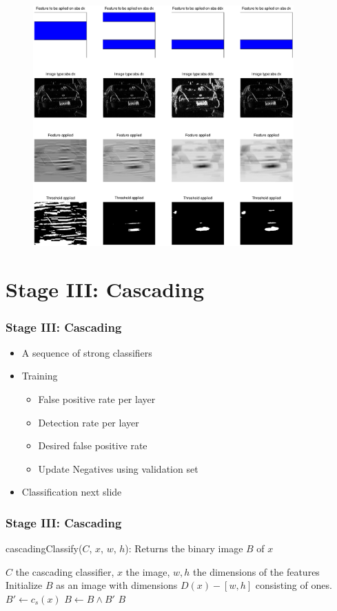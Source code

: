 \documentclass{beamer}
\begin{document}
\frame
{
	\begin{figure}[!ht]
	\centering
	\includegraphics[width=10cm]{../report/img/strongClassifier_layer2_img14}
	\label{fig:strongclassify}
	\end{figure}
}

\section{Stage III: Cascading}
\frame
{
  \frametitle{Stage III: Cascading}
	
  \begin{itemize}
  \item <+-| alert@+> A sequence of strong classifiers
  \item <+-| alert@+> Training
  \begin{itemize}
  	\item False positive rate per layer
  	\item Detection rate per layer
  	\item Desired false positive rate
  	\item Update Negatives using validation set
  \end{itemize}
  \item <+-| alert@+> Classification next slide
  \end{itemize}
}

\frame
{
  \frametitle{Stage III: Cascading}
  \begin{algorithm}[H]
  	\caption{cascadingClassify($C$, $x$, $w$, $h$): Returns the binary image $B$ of $x$}
  	\begin{algorithmic}[1]
  	\REQUIRE $C$ the cascading classifier, $x$ the image, $w,h$ the dimensions of the features
  	\medskip
  	\STATE Initialize $B$ as an image with dimensions $D(x) - [w,h]$ consisting of ones.
  		\STATE $B' \leftarrow c_s(x)$
  		\STATE $B \leftarrow B \land B'$
  	\ENDFOR
  	\RETURN $B$
  	\end{algorithmic}
  \label{alg:casc}
  \end{algorithm}
}
\end{document}
